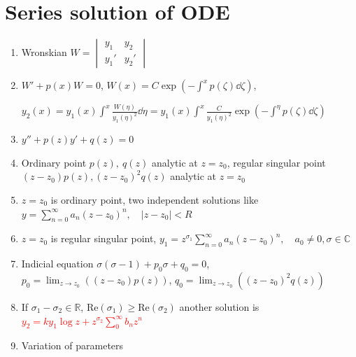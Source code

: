 \documentclass{article}
\theoremstyle{remark}
\theoremstyle{remark}
\begin{document}
    \section*{Series solution of ODE}
    \begin{enumerate}
        \item Wronskian $W=\begin{vmatrix}
            y_1 & y_2\\
            y_1' & y_2'
        \end{vmatrix}$
        \item $W'+p(x)W=0$, $W(x)=C\exp\left(-\int^x p(\zeta)\dd\zeta\right)$, 
        
        $y_2(x)=y_1(x)\int^x\frac{W(\eta)}{y_1(\eta)^2}\dd\eta = y_1(x)\int^x\frac{C}{y_1(\eta)^2}\exp\left(-\int^\eta p(\zeta)\dd\zeta\right)$
        \item $y''+p(z)y'+q(z)=0$
        \item Ordinary point $p(z),\ q(z)$ analytic at $z=z_0$, regular singular point $(z-z_0)p(z),(z-z_0)^2q(z)$ analytic at $z=z_0$
        \item $z=z_0$ is ordinary point, two independent solutions like $y=\sum_{n=0}^{\infty}a_n(z-z_0)^n, \quad |z-z_0|<R$
        \item $z=z_0$ is regular singular point, $y_1=z^{\sigma_1}\sum_{n=0}^{\infty}a_n (z-z_0)^n,\quad a_0\neq 0, \sigma\in\mathbb{C}$
        \item Indicial equation $\sigma(\sigma-1)+p_0\sigma+q_0 = 0$, $p_0=\lim_{z\rightarrow z_0}((z-z_0)p(z))$, $q_0=\lim_{z\rightarrow z_0}((z-z_0)^2q(z))$
        \item If $\sigma_1-\sigma_2\in \mathbb{R}$, $\mathrm{Re}(\sigma_1)\geq\mathrm{Re}(\sigma_2)$ another solution is \textcolor{red}{$y_2 = ky_1\log z + z^{\sigma_2}\sum_{0}^{\infty}b_n z^n$}
        \item Variation of parameters 
    \end{enumerate}
\end{document}
